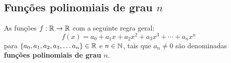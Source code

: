 \subsection{Funções polinomiais de grau \texorpdfstring{$n$}{n}}

 \vskip0.3cm
 \colorbox{azul}{
 \begin{minipage}{0.9\linewidth}
 \begin{center}
 As funções $f: \mathbb{R} \to \mathbb{R}$ com a seguinte regra geral:
 \[f(x) = a_0 + a_1 x + a_2 x^2 + a_3 x^3 + \cdots + a_n x^n\]
 para $\{a_0, a_1, a_2, a_3, \ldots a_n\} \in \mathbb{R}$ e $n \in \mathbb{N}$, tais que $a_n \neq 0$ são denominadas \\ \textbf{funções polinomiais de grau $n$}.
 \end{center}
 \end{minipage}}
 \vskip0.3cm



